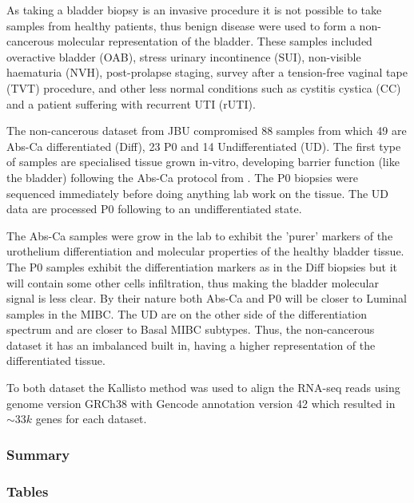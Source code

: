As taking a bladder biopsy is an invasive procedure it is not possible to take samples from healthy patients, thus benign disease were used to form a non-cancerous molecular representation of the bladder. These samples included overactive bladder (OAB), stress urinary incontinence (SUI), non-visible haematuria (NVH), post-prolapse staging, survey after a tension-free vaginal tape (TVT) procedure, and other less normal conditions such as cystitis cystica (CC) and a patient suffering with recurrent UTI (rUTI).

The non-cancerous dataset from JBU compromised 88 samples from which 49 are Abs-Ca differentiated (Diff), 23 P0 and 14 Undifferentiated (UD). The first type of samples are specialised tissue grown in-vitro, developing barrier function (like the bladder) following the Abs-Ca protocol from \cite{Cross2005-fe}. The P0 biopsies were sequenced immediately before doing anything lab work on the tissue. The UD data are processed P0 following \cite{Cross2005-fe} to an undifferentiated state. 

The Abs-Ca samples were grow in the lab to exhibit the 'purer' markers of the urothelium differentiation and molecular properties of the healthy bladder tissue. The P0 samples exhibit the differentiation markers as in the Diff biopsies but it will contain some other cells infiltration, thus making the bladder molecular signal is less clear. By their nature both Abs-Ca and P0 will be closer to Luminal samples in the MIBC. The UD are on the other side of the differentiation spectrum and are closer to Basal MIBC subtypes. Thus, the non-cancerous dataset it has an imbalanced built in, having a higher representation of the differentiated tissue. 

To both dataset the Kallisto method was used to align the RNA-seq reads using genome version GRCh38 with Gencode annotation version 42 which resulted in $\sim33k$ genes for each dataset.


\subsubsection{Summary}


\pagebreak

\subsubsection{Tables}



